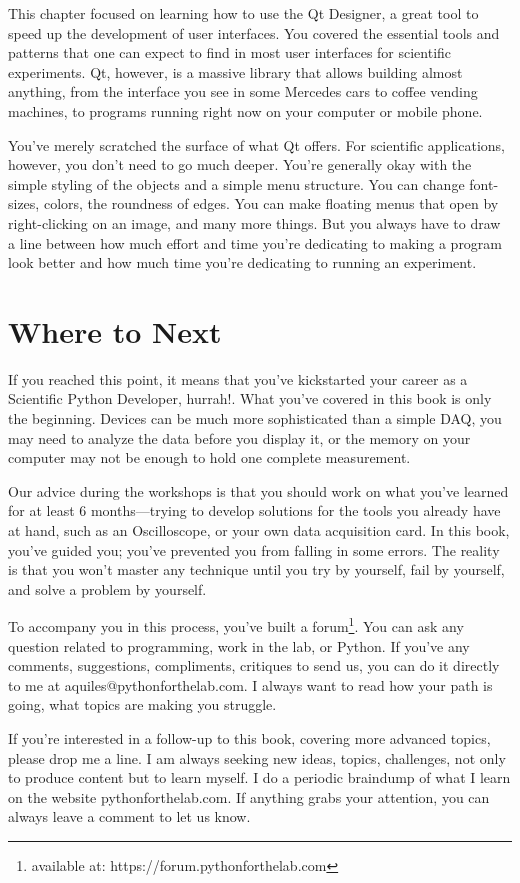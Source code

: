 This chapter focused on learning how to use the Qt Designer, a great tool to speed up the development of user interfaces. You covered the essential tools and patterns that one can expect to find in most user interfaces for scientific experiments. Qt, however, is a massive library that allows building almost anything, from the interface you see in some Mercedes cars to coffee vending machines, to programs running right now on your computer or mobile phone.

You've merely scratched the surface of what Qt offers. For scientific applications, however, you don't need to go much deeper. You're generally okay with the simple styling of the objects and a simple menu structure. You can change font-sizes, colors, the roundness of edges. You can make floating menus that open by right-clicking on an image, and many more things. But you always have to draw a line between how much effort and time you're dedicating to making a program look better and how much time you're dedicating to running an experiment.

\section{Where to Next}\label{sec:where-to-next}
If you reached this point, it means that you've kickstarted your career as a Scientific Python Developer, hurrah!. What you've covered in this book is only the beginning. Devices can be much more sophisticated than a simple DAQ, you may need to analyze the data before you display it, or the memory on your computer may not be enough to hold one complete measurement.

Our advice during the workshops is that you should work on what you've learned for at least 6 months—trying to develop solutions for the tools you already have at hand, such as an Oscilloscope, or your own data acquisition card. In this book, you've guided you; you've prevented you from falling in some errors. The reality is that you won't master any technique until you try by yourself, fail by yourself, and solve a problem by yourself.

To accompany you in this process, you've built a forum\footnote{available at: https://forum.pythonforthelab.com}.  You can ask any question related to programming, work in the lab, or Python. If you've any comments, suggestions, compliments, critiques to send us, you can do it directly to me at aquiles@pythonforthelab.com. I always want to read how your path is going, what topics are making you struggle.

If you're interested in a follow-up to this book, covering more advanced topics, please drop me a line. I am always seeking new ideas, topics, challenges, not only to produce content but to learn myself. I do a periodic braindump of what I learn on the website pythonforthelab.com. If anything grabs your attention, you can always leave a comment to let us know.
